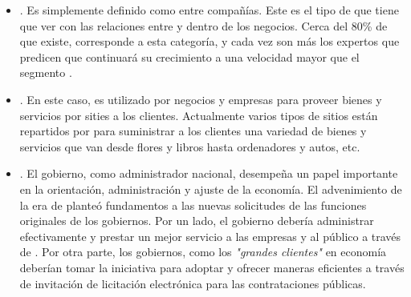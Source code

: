 \begin{itemize}
	\item \textbf{\btob}. Es simplemente definido como \ecommerceCOM entre compañías. Este es el tipo de \ecommerceCOM que tiene que ver con las relaciones entre y dentro de los negocios. Cerca del 80\% de \ecommerceCOM que existe, corresponde a esta categoría, y cada vez son más los expertos que predicen que \btob \ecommerceCOM continuará su crecimiento a una velocidad mayor que el segmento \btoc.


	\item \textbf{\btoc}. En este caso, \internetINT es utilizado por negocios y empresas para proveer bienes y servicios por sities \webINT a los clientes. Actualmente varios tipos de sitios \webINT \btoc están repartidos por \internetINT para suministrar a los clientes una variedad de bienes y servicios que van desde flores y libros hasta ordenadores y autos, etc.

	\item \textbf{\btog}. El gobierno, como administrador nacional, desempeña un papel importante en la orientación, administración y ajuste de la economía. El advenimiento de la era de \ecommerceCOM planteó fundamentos \ecommerceCOM a las nuevas solicitudes de las funciones originales de los gobiernos. Por un lado, el gobierno debería  administrar \emarket efectivamente y prestar un mejor servicio a las empresas y al público a través de \egoverment. Por otra parte, los gobiernos, como los \textit{"grandes clientes"} en economía deberían tomar la iniciativa para adoptar \ecommerceCOM y ofrecer maneras eficientes a través de invitación de licitación electrónica para las contrataciones públicas.



\end{itemize}
